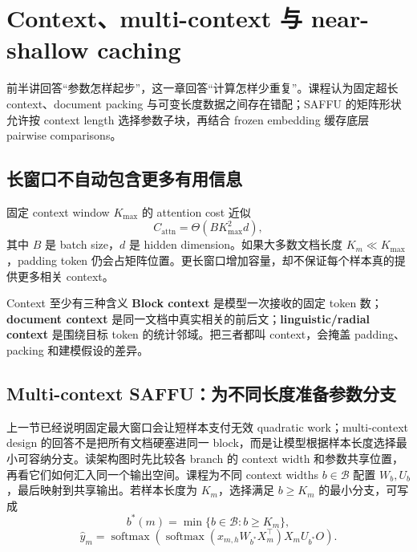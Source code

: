 \section{Context、multi-context 与 near-shallow caching}

前半讲回答“参数怎样起步”，这一章回答“计算怎样少重复”。课程认为固定超长 context、document packing 与可变长度数据之间存在错配；SAFFU 的矩阵形状允许按 context length 选择参数子块，再结合 frozen embedding 缓存底层 pairwise comparisons。

\subsection{长窗口不自动包含更多有用信息}

固定 context window $K_{\max}$ 的 attention cost 近似
\[
C_{\text{attn}}=\Theta(BK_{\max}^{2}d),
\]
其中 $B$ 是 batch size，$d$ 是 hidden dimension。如果大多数文档长度 $K_m\ll K_{\max}$，padding token 仍会占矩阵位置。更长窗口增加容量，却不保证每个样本真的提供更多相关 context。


\begin{knowledgebox}{Context 至少有三种含义}
\textbf{Block context} 是模型一次接收的固定 token 数；\textbf{document context} 是同一文档中真实相关的前后文；\textbf{linguistic/radial context} 是围绕目标 token 的统计邻域。把三者都叫 context，会掩盖 padding、packing 和建模假设的差异。
\end{knowledgebox}


\subsection{Multi-context SAFFU：为不同长度准备参数分支}

上一节已经说明固定最大窗口会让短样本支付无效 quadratic work；multi-context design 的回答不是把所有文档硬塞进同一 block，而是让模型根据样本长度选择最小可容纳分支。读架构图时先比较各 branch 的 context width 和参数共享位置，再看它们如何汇入同一个输出空间。课程为不同 context widths $b\in\mathcal B$ 配置 $W_b,U_b$，最后映射到共享输出。若样本长度为 $K_m$，选择满足 $b\ge K_m$ 的最小分支，可写成
\[
b^*(m)=\min\{b\in\mathcal B:b\ge K_m\},
\]
\[
\hat y_m=\operatorname{softmax}\!\left(
\operatorname{softmax}(x_{m,h}W_{b^*}X_m^\top)X_mU_{b^*}O
\right).
\]

